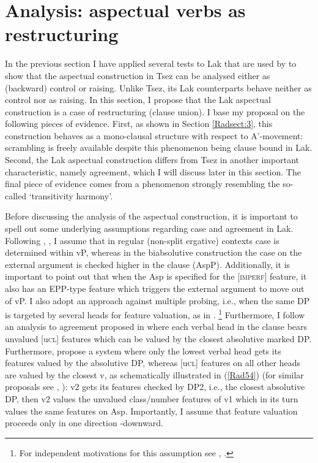 \documentclass[output=paper]{langscibook}
\begin{document}
\section{Analysis: aspectual verbs as restructuring}
In the previous section I have applied several tests to Lak that are used by \citet{PolinskyPotsdam2002} to show that the aspectual construction in Tsez can be analysed either as (backward) control or raising. Unlike Tsez, its Lak counterparts behave neither as control nor as raising. In this section, I propose that the Lak aspectual construction is a case of restructuring (clause union). I base my proposal on the following pieces of evidence. First, as shown in Section \ref{Radsect:3}, this construction behaves as a mono-clausal structure with respect to A'-movement: scrambling is freely available despite this phenomenon being clause bound in Lak. Second, the Lak aspectual construction differs from Tsez in another important characteristic, namely agreement, which I will discuss later in this section. The final piece of evidence comes from a phenomenon strongly resembling the so-called ‘transitivity harmony’.

Before discussing the analysis of the aspectual construction, it is important to spell out some underlying assumptions regarding case and agreement in Lak. Following \cite{GagliardiRadkevich2014}, \citet{Radkevich2017},  I assume that in regular (non-split ergative) contexts  case is determined within vP, whereas in the biabsolutive construction the case on the external argument is checked higher in the clause (AspP). Additionally, it is important to point out that when the Asp is specified for the [\textsc{imperf}] feature, it also has an EPP-type feature which triggers the external argument to move out of vP. I also adopt an approach against multiple probing, i.e., when the same DP is targeted by several heads for feature valuation, as in \citet{PolinskyChumakina2017}. \footnote{For independent motivations for this assumption see \cite{Rezac2003}, \cite{BakerWillie2010}.} Furthermore, I follow an analysis to agreement proposed in \citet{PolinskyChumakina2017} where each verbal head in the clause bears unvalued [u\textsc{cl}] features which can be valued by the closest absolutive marked DP. Furthermore, \citet{PolinskyChumakina2017} propose a system where only the lowest verbal head gets its features valued by the absolutive DP, whereas [u\textsc{cl}] features on all other heads are valued by the closest v, as schematically illustrated in (\ref{Rad54}) (for similar proposals see \citealt{Collins2003}, \citealt{BakerWillie2010}): v2 gets its features checked by DP2, i.e., the closest absolutive DP, then v2 values the unvalued class/number features of v1 which in its turn values the same features on Asp. Importantly, I assume that feature valuation proceeds only in one direction -downward.
\end{document}
